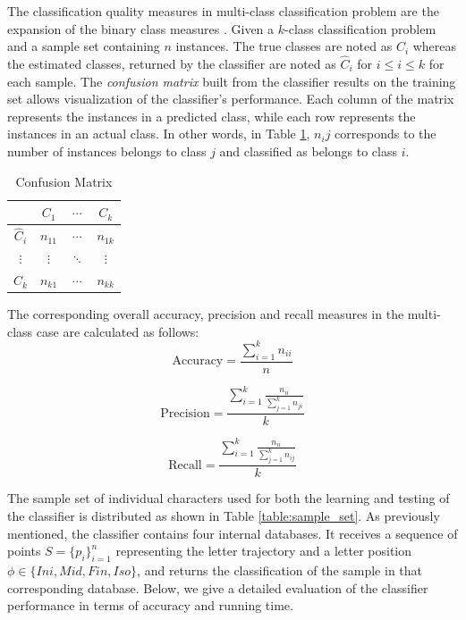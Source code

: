 The classification quality measures in multi-class classification problem are the expansion of the binary class measures \cite{sokolova2009systematic} \cite{labatut2012accuracy}.
Given a $k$-class classification problem and a sample set containing $n$ instances.
The true classes are noted as $C_i$ whereas the estimated classes, returned by the classifier are noted as $\hat{C}_i$ for $i\leq i \leq k$ for each sample.
The \emph{confusion matrix} built from the classifier results on the training set allows visualization of the classifier's performance.
Each column of the matrix represents the instances in a predicted class, while each row represents the instances in an actual class.
In other words, in Table \ref{table:confusion_matrix}, $n_ij$ corresponds to the number of instances belongs to class $j$ and classified as belongs to class $i$.

\begin{table}
\centering
\begin{tabular}{| c | c | c | c |}
\hline                 
              & $C_1$    & $\cdots$ & $C_k$ \\ 
  \hline
  $\hat{C}_i$ & $n_{11}$ & $\cdots$ & $n_{1k}$ \\
  \hline
  $\vdots$    & $\vdots$ & $\ddots$ & $\vdots$ \\
  \hline
  $\hat{C}_k$ & $n_{k1}$ & $\cdots$ & $n_{kk}$ \\
  \hline
\end{tabular}
\caption{Confusion Matrix}
\label{table:confusion_matrix} 
\end{table}

The corresponding overall accuracy, precision and recall measures in the multi-class case are calculated as follows:
\begin{equation}
\text{Accuracy}=\frac{\sum\limits_{i=1}^{k} n_{ii}}{n}
\label{eq:accuracy}
\end{equation}

\begin{equation}
\text{Precision}=\frac{\sum\limits_{i=1}^{k} \frac{n_{ii}}{\sum_{j=1}^{k} n_{ji}}}{k}
\label{eq:percision}
\end{equation}

\begin{equation}
\text{Recall}=   \frac{\sum\limits_{i=1}^{k} \frac{n_{ii}}{\sum_{j=1}^{k} n_{ij}}}{k}
\label{eq:percision}
\end{equation}


\iftoggle{edit-mode}{\hspace{0pt}\marginpar{The sample set}}{}
The sample set of individual characters used for both the learning and testing of the classifier is distributed as shown in Table \ref{table:sample_set}.
As previously mentioned, the classifier contains four internal databases. 
It receives a sequence of points $S=\{p_{i}\}_{i=1}^{n}$ representing the letter trajectory and a letter position $\phi \in \{Ini, Mid, Fin, Iso\}$, and returns the classification of the sample in that corresponding database.
Below, we give a detailed evaluation of the classifier performance in terms of accuracy and running time.

